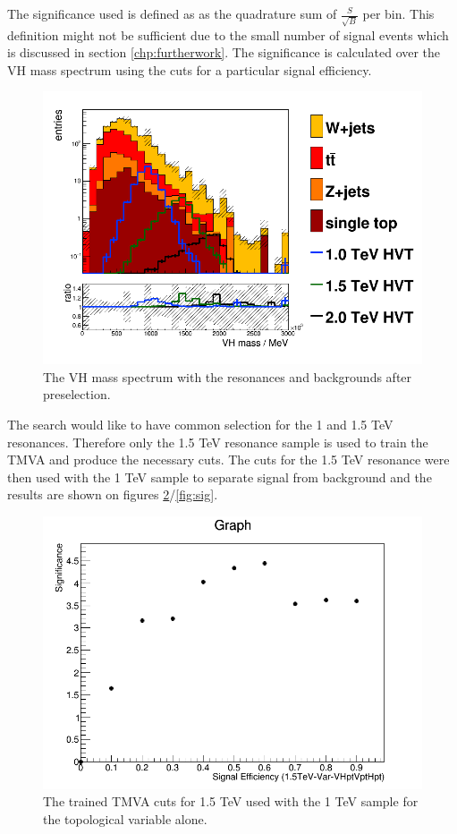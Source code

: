 The significance used is defined as as the quadrature sum of $\frac{S}{\sqrt{B}}$ per bin. This definition might not be sufficient due to the small number of signal events which is discussed in section \ref{chp:furtherwork}. The significance is calculated over the VH mass spectrum using the cuts for a particular signal efficiency.  

\begin{figure}[H]
\hspace{-1cm}
\includegraphics[scale=0.5]{figures/vh_m_log.png}
\caption{The VH mass spectrum with the resonances and backgrounds after preselection.}
\label{fig:vhspectrum}
\end{figure}

The search would like to have common selection for the 1 and 1.5 TeV resonances. Therefore only the 1.5 TeV resonance sample is used to train the TMVA and produce the necessary cuts. The cuts for the 1.5 TeV resonance were then used with the 1 TeV sample to separate signal from background and the results are shown on figures \ref{fig:vhsig}/\ref{fig:sig}.     
\begin{figure}[H]
\hspace{-1cm}
\includegraphics[scale=0.5]{figures/15TeVTrained-data10-Var-VHptVptHpt.png}
\caption{The trained TMVA cuts for 1.5 TeV used with the 1 TeV sample for the topological variable alone. }
\label{fig:vhsig}
\end{figure}


